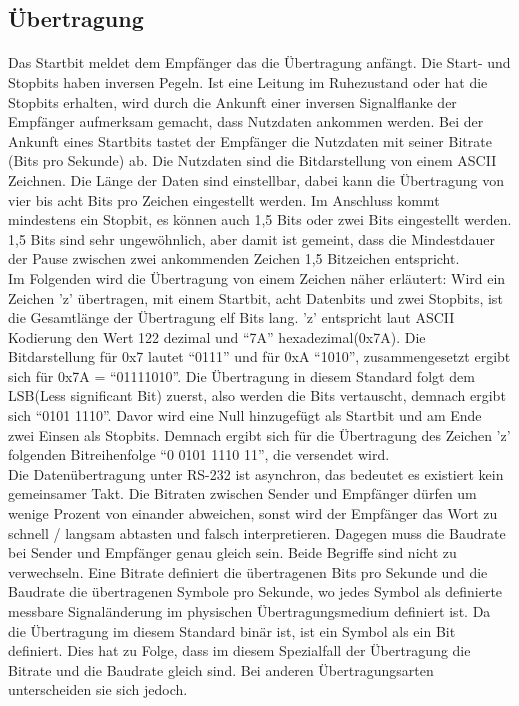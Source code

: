 \subsection{Übertragung}
\paragraph{}
Das Startbit meldet dem Empfänger das die Übertragung anfängt. Die Start- und Stopbits haben inversen Pegeln. Ist eine Leitung im Ruhezustand oder hat die Stopbits erhalten, wird durch die Ankunft einer inversen Signalflanke der Empfänger aufmerksam gemacht, dass Nutzdaten ankommen werden. Bei der Ankunft eines Startbits tastet der Empfänger die Nutzdaten mit seiner Bitrate (Bits pro Sekunde) ab. Die Nutzdaten sind die Bitdarstellung von einem ASCII Zeichnen. Die Länge der Daten sind einstellbar, dabei kann die Übertragung von vier bis acht Bits pro Zeichen eingestellt werden. Im Anschluss kommt mindestens ein Stopbit, es können auch 1,5 Bits oder zwei Bits eingestellt werden. 1,5 Bits sind sehr ungewöhnlich, aber damit ist gemeint, dass die Mindestdauer der Pause zwischen zwei ankommenden Zeichen 1,5 Bitzeichen entspricht. \\

Im Folgenden wird die Übertragung von einem Zeichen näher erläutert:
Wird ein Zeichen 'z' übertragen, mit einem Startbit, acht Datenbits und zwei Stopbits, ist die Gesamtlänge der Übertragung elf Bits lang. 'z' entspricht laut ASCII Kodierung den Wert 122 dezimal und "`7A"' hexadezimal(0x7A). Die Bitdarstellung für 0x7 lautet "`0111"' und für 0xA "`1010"', zusammengesetzt ergibt sich für 0x7A = "`01111010"'. Die Übertragung in diesem Standard folgt dem LSB(Less significant Bit) zuerst, also werden die Bits vertauscht, demnach ergibt sich "`0101 1110"'. Davor wird eine Null hinzugefügt als Startbit und am Ende zwei Einsen als Stopbits. Demnach ergibt sich für die Übertragung des Zeichen 'z' folgenden Bitreihenfolge "`0 0101 1110 11"', die versendet wird.\\

Die Datenübertragung unter RS-232 ist asynchron, das bedeutet es existiert kein gemeinsamer Takt. Die Bitraten zwischen Sender und Empfänger dürfen um wenige Prozent von einander abweichen, sonst wird der Empfänger das Wort zu schnell / langsam abtasten und falsch interpretieren. Dagegen muss die Baudrate bei Sender und Empfänger genau gleich sein. Beide Begriffe sind nicht zu verwechseln. Eine Bitrate definiert die übertragenen Bits pro Sekunde und die Baudrate die übertragenen Symbole pro Sekunde, wo jedes Symbol als definierte messbare Signaländerung im physischen Übertragungsmedium definiert ist. Da die Übertragung im diesem Standard binär ist, ist ein Symbol als ein Bit definiert. Dies hat zu Folge, dass im diesem Spezialfall der Übertragung die Bitrate und die Baudrate gleich sind. Bei anderen Übertragungsarten unterscheiden sie sich jedoch.\\


